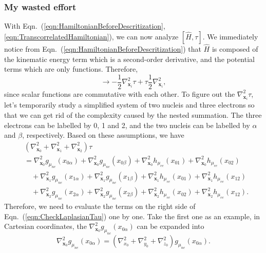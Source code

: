 \subsubsection{My wasted effort}
With Eqn.~(\ref{eqn:HamiltonianBeforeDescritization}, \ref{eqn:TranscorrelatedHamiltonian}), we can now analyze $[\hat{H},\tau]$. We immediately notice from Eqn.~(\ref{eqn:HamiltonianBeforeDescritization}) that $\hat{H}$ is composed of the kinematic energy term which is a second-order derivative, and the potential terms which are only functions. Therefore,
\begin{equation}
    [\hat{H}, \tau]\rightarrow -\frac{1}{2}\nabla_{\textbf{x}_i}^2\tau+\tau\frac{1}{2}\nabla_{\textbf{x}_i}^2,
    \label{eqn:equivalentCommutator}
\end{equation}
since scalar functions are commutative with each other. To figure out the $\nabla_{\textbf{x}_i}^2\tau$, let's temporarily study a simplified system of two nucleis and three electrons so that we can get rid of the complexity caused by the nested summation.  The three electrons can be labelled by 0, 1 and 2, and the two nucleis can be labelled by $\alpha$ and $\beta$, respectively. Based on these assumptions, we have
\begin{equation}
    \begin{split}
        &(\nabla_{\textbf{x}_0}^2+\nabla_{\textbf{x}_1}^2+\nabla_{\textbf{x}_2}^2)\tau \\
        &=\nabla_{\textbf{x}_0}^2g_{\mu_{ne}}(x_{0\alpha})+\nabla_{\textbf{x}_0}^2g_{\mu_{ne}}(x_{0\beta})+\nabla_{\textbf{x}_0}^2h_{\mu_{ee}}(x_{01})+\nabla_{\textbf{x}_0}^2h_{\mu_{ee}}(x_{02}) \\
        &\quad+\nabla_{\textbf{x}_1}^2g_{\mu_{ne}}(x_{1\alpha})+\nabla_{\textbf{x}_1}^2g_{\mu_{ne}}(x_{1\beta})+\nabla_{\textbf{x}_1}^2h_{\mu_{ee}}(x_{01})+\nabla_{\textbf{x}_1}^2h_{\mu_{ee}}(x_{12}) \\
        &\quad+\nabla_{\textbf{x}_2}^2g_{\mu_{ne}}(x_{2\alpha})+\nabla_{\textbf{x}_2}^2g_{\mu_{ne}}(x_{2\beta})+\nabla_{\textbf{x}_2}^2h_{\mu_{ee}}(x_{02})+\nabla_{\textbf{x}_2}^2h_{\mu_{ee}}(x_{12}).
    \end{split}
    \label{eqn:CheckLaplasianTau}
\end{equation}
Therefore, we need to evaluate the terms on the right side of Eqn.~(\ref{eqn:CheckLaplasianTau}) one by one. Take the first one as an example, in Cartesian coordinates, the $\nabla_{\textbf{x}_0}^2g_{\mu_{ne}}(x_{0\alpha})$ can be expanded into
\begin{equation}
    \nabla_{\mathbf{x}_0}^2g_{\mu_{ne}}(x_{0\alpha})=(\nabla_{x_0}^2+\nabla_{y_0}^2+\nabla_{z_0}^2)g_{\mu_{ne}}(x_{0\alpha}).
\end{equation}
